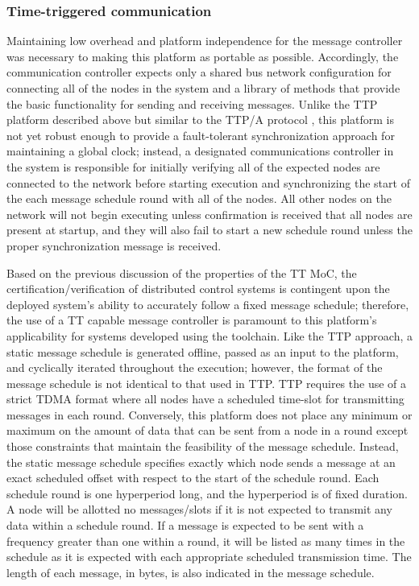 \subsubsection*{Time-triggered communication}
Maintaining low overhead and platform independence for the message controller was necessary to making this platform as portable as possible.  Accordingly, the communication controller expects only a shared bus network configuration for connecting all of the nodes in the system and a library of methods that provide the basic functionality for sending and receiving messages.  Unlike the TTP platform described above but similar to the TTP/A protocol \cite{kopetz:2000-23}, this platform is not yet robust enough to provide a fault-tolerant synchronization approach for maintaining a global clock; instead, a designated communications controller in the system is responsible for initially verifying all of the expected nodes are connected to the network before starting execution and synchronizing the start of the each message schedule round with all of the nodes.  All other nodes on the network will not begin executing unless confirmation is received that all nodes are present at startup, and they will also fail to start a new schedule round unless the proper synchronization message is received.

Based on the previous discussion of the properties of the TT MoC, the certification/verification of distributed control systems is contingent upon the deployed system's ability to accurately follow a fixed message schedule; therefore, the use of a TT capable message controller is paramount to this platform's applicability for systems developed using the toolchain.  Like the TTP approach, a static message schedule is generated offline, passed as an input to the platform, and cyclically iterated throughout the execution; however, the format of the message schedule is not identical to that used in TTP.  TTP requires the use of a strict TDMA format where all nodes have a scheduled time-slot for transmitting messages in each round.  Conversely, this platform does not place any minimum or maximum on the amount of data that can be sent from a node in a round except those constraints that maintain the feasibility of the message schedule.  Instead, the static message schedule specifies exactly which node sends a message at an exact scheduled offset with respect to the start of the schedule round.  Each schedule round is one hyperperiod long, and the hyperperiod is of fixed duration.  A node will be allotted no messages/slots if it is not expected to transmit any data within a schedule round.  If a message is expected to be sent with a frequency greater than one within a round, it will be listed as many times in the schedule as it is expected with each appropriate scheduled transmission time.  The length of each message, in bytes, is also indicated in the message schedule.

